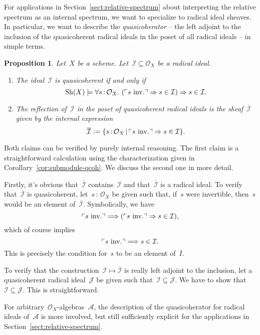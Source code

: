 \documentclass[10pt,reqno,a4paper]{amsbook}
\makeatletter
\theoremstyle{definition}
\theoremstyle{plain}
\newtheorem{prop}[defn]{Proposition}
\theoremstyle{remark}
\newcommand{\A}{\mathcal{A}}
\renewcommand{\O}{\mathcal{O}}
\newcommand{\I}{\mathcal{I}}
\newcommand{\J}{\mathcal{J}}
\newcommand{\Sh}{\mathrm{Sh}}
\newcommand{\?}{\,{:}\,}
\renewcommand{\_}{\mathpunct{.}\,}
\newcommand{\speak}[1]{\ulcorner\text{\textnormal{#1}}\urcorner}
\newcommand{\inv}{inv.\@}
\newcommand{\defeq}{\vcentcolon=}
\renewenvironment{proof}[1][\proofname]{\par
  \pushQED{\qed}%
  \normalfont \topsep6\p@\@plus6\p@\relax
  \trivlist
  \item[\hskip\labelsep
        \itshape
    #1\@addpunct{.}]\ignorespaces
}{%
  \popQED\endtrivlist\@endpefalse
}
\makeatother
\begin{document}
For applications in Section~\ref{sect:relative-spectrum} about interpreting the
relative spectrum as an internal spectrum, we want to specialize to radical
ideal sheaves. In particular, we want to describe the \emph{quasicoherator} --
the left adjoint to the inclusion of the quasicoherent radical ideals in the
poset of all radical ideals -- in simple terms.

\begin{prop}\label{prop:quasicoherator-structure-sheaf}
Let~$X$ be a scheme. Let~$\I \subseteq \O_X$ be a radical ideal.
\begin{enumerate}
\item The ideal~$\I$ is quasicoherent if and only if
\[ \Sh(X) \models \forall s\?\O_X\_ (\speak{$s$ \inv} \Rightarrow s\in\I)
\Rightarrow s\in\I. \]
\item The reflection of~$\I$ in the poset of quasicoherent radical ideals is
the sheaf~$\overline{\I}$ given by the internal expression
\[ \overline{\I} \defeq \{ s\?\O_X \,|\, \speak{$s$ \inv} \Rightarrow s\in\I
\}. \]
\end{enumerate}
\end{prop}
\begin{proof}Both claims can be verified by purely internal reasoning. The
first claim is a straightforward calculation using the characterization given in
Corollary~\ref{cor:submodule-qcoh}. We discuss the second one in more detail.

Firstly, it's obvious that~$\overline{\I}$ contains~$\I$ and
that~$\overline{\I}$ is a radical ideal. To verify that~$\overline{\I}$ is
quasicoherent, let~$s\?\O_X$ be given such that, if~$s$ were invertible,
then~$s$ would be an element of~$\overline{\I}$. Symbolically, we have
\[ \speak{$s$ \inv} \Longrightarrow (\speak{$s$ \inv} \Rightarrow s\in\I), \]
which of course implies
\[ \speak{$s$ \inv} \Longrightarrow s\in\I. \]
This is precisely the condition for~$s$ to be an element of~$\overline{I}$.

To verify that the construction~$\I \mapsto \overline{\I}$ is really left
adjoint to the inclusion, let a quasicoherent radical ideal~$\J$ be given such
that~$\I \subseteq \J$. We have to show that~$\overline{\I} \subseteq \J$. This
is straightforward.
\end{proof}

For arbitrary~$\O_X$-algebras~$\A$, the description of the quasicoherator for
radical ideals of~$\A$ is more involved, but still sufficiently explicit for the
applications in Section~\ref{sect:relative-spectrum}.
\end{document}
